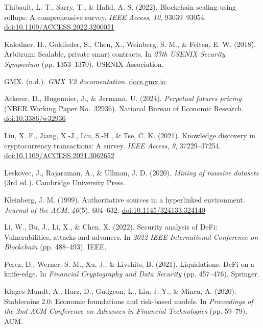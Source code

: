 \begin{enumerate}[label={[\arabic*]}, leftmargin=*, itemsep=0.35em, parsep=0pt]
  \item{}\label{ref:44} Thibault, L. T., Sarry, T., \& Hafid, A. S. (2022). Blockchain scaling using rollups: A comprehensive survey. \textit{IEEE Access}, \textit{10}, 93039--93054. \href{https://doi.org/10.1109/ACCESS.2022.3200051}{doi:10.1109/ACCESS.2022.3200051}
  \item{}\label{ref:45} Kalodner, H., Goldfeder, S., Chen, X., Weinberg, S. M., \& Felten, E. W. (2018). Arbitrum: Scalable, private smart contracts. In \textit{27th USENIX Security Symposium} (pp. 1353--1370). USENIX Association.
  \item{}\label{ref:46} GMX. (n.d.). \textit{GMX V2 documentation}. \href{https://docs.gmx.io/}{docs.gmx.io}
  \item{}\label{ref:47} Ackerer, D., Hugonnier, J., \& Jermann, U. (2024). \textit{Perpetual futures pricing} (NBER Working Paper No.\ 32936). National Bureau of Economic Research. \href{https://doi.org/10.3386/w32936}{doi:10.3386/w32936}
  \item{}\label{ref:48} Liu, X. F., Jiang, X.-J., Liu, S.-H., \& Tse, C. K. (2021). Knowledge discovery in cryptocurrency transactions: A survey. \textit{IEEE Access}, \textit{9}, 37229--37254. \href{https://doi.org/10.1109/ACCESS.2021.3062652}{doi:10.1109/ACCESS.2021.3062652}
  \item{}\label{ref:49} Leskovec, J., Rajaraman, A., \& Ullman, J. D. (2020). \textit{Mining of massive datasets} (3rd ed.). Cambridge University Press.
  \item{}\label{ref:50} Kleinberg, J. M. (1999). Authoritative sources in a hyperlinked environment. \textit{Journal of the ACM}, \textit{46}(5), 604--632. \href{https://doi.org/10.1145/324133.324140}{doi:10.1145/324133.324140}
  \item{}\label{ref:51} Li, W., Bu, J., Li, X., \& Chen, X. (2022). Security analysis of DeFi: Vulnerabilities, attacks and advances. In \textit{2022 IEEE International Conference on Blockchain} (pp. 488--493). IEEE.
  \item{}\label{ref:52} Perez, D., Werner, S. M., Xu, J., \& Livshits, B. (2021). Liquidations: DeFi on a knife-edge. In \textit{Financial Cryptography and Data Security} (pp. 457--476). Springer.
  \item{}\label{ref:53} Klages-Mundt, A., Harz, D., Gudgeon, L., Liu, J.-Y., \& Minca, A. (2020). Stablecoins 2.0: Economic foundations and risk-based models. In \textit{Proceedings of the 2nd ACM Conference on Advances in Financial Technologies} (pp. 59--79). ACM.

\end{enumerate}
